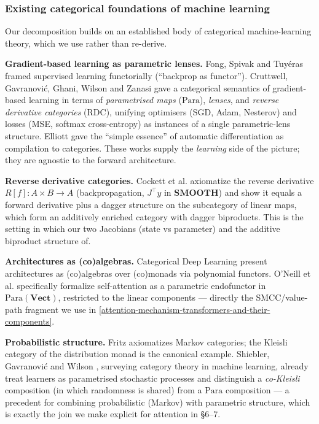 \documentclass[a4paper,11pt]{article}
\begin{document}
\hypertarget{existing-categorical-foundations-of-machine-learning}{%
\subsubsection{Existing categorical foundations of machine learning}\label{existing-categorical-foundations-of-machine-learning}}

Our decomposition builds on an established body of categorical machine-learning theory, which we use rather than re-derive.

\textbf{Gradient-based learning as parametric lenses.} Fong, Spivak and Tuyéras \cite{fong2019backprop} framed supervised learning functorially (``backprop as functor''). Cruttwell, Gavranović, Ghani, Wilson and Zanasi \cite{cruttwell2022categorical} gave a categorical semantics of gradient-based learning in terms of \emph{parametrised maps} (\(\mathrm{Para}\)), \emph{lenses},
and \emph{reverse derivative categories} (RDC), unifying optimisers (SGD, Adam, Nesterov) and losses (MSE, softmax cross-entropy) as
instances of a single parametric-lens structure. Elliott \cite{elliott2018simple} gave
the ``simple essence'' of automatic differentiation as compilation to categories. These works supply the \emph{learning} side of the picture;
they are agnostic to the forward architecture.

\textbf{Reverse derivative categories.} Cockett et al.\cite{CRDC}
axiomatize the reverse derivative \(R[f]:A\times B\to A\) (backpropagation, \(J^\top y\) in \(\mathbf{SMOOTH}\)) and show it
equals a forward derivative plus a dagger structure on the subcategory
of linear maps, which form an additively enriched category with dagger biproducts. This is the setting in which our two Jacobians (state vs parameter) and the additive biproduct structure of.

\textbf{Architectures as (co)algebras.} Categorical Deep Learning\cite{gavranovic2024categorical} present architectures as (co)algebras over (co)monads via polynomial functors. O'Neill et al.\cite{oneill2025selfattentionparametricendofunctorcategorical} specifically formalize self-attention as a parametric endofunctor in \(\mathrm{Para}(\mathbf{Vect})\), restricted to the linear components --- directly the SMCC/value-path fragment we use in \ref{attention-mechanism-transformers-and-their-components}.

\textbf{Probabilistic structure.} Fritz \cite{Markov} axiomatizes Markov categories; the Kleisli category of the distribution monad is the
canonical example. Shiebler, Gavranović and Wilson \cite{shiebler2021category}, surveying category theory in machine learning, already treat learners as
parametrised stochastic processes and distinguish a \emph{co-Kleisli} composition (in which randomness is shared) from a
\emph{\(\mathrm{Para}\)} composition --- a precedent for combining probabilistic (Markov) with parametric structure, which is exactly the
join we make explicit for attention in §6--7.
\end{document}
